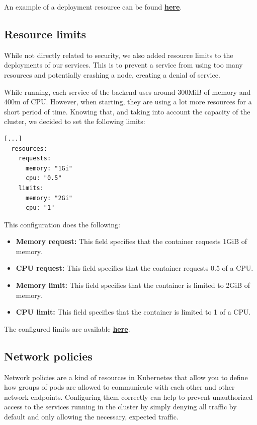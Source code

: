 \documentclass[12pt,x11names]{article}
\begin{document}
\medskip
An example of a deployment resource can be found \href{https://github.com/thomas-mauran/LinkedOut/blob/main/kube/base/api_gateway/deployment.yml}{\textbf{here}}.

\subsection{Resource limits}

While not directly related to security, we also added resource limits to the deployments
of our services. This is to prevent a service from using too many resources and potentially
crashing a node, creating a denial of service.

\medskip
While running, each service of the backend uses around 300MiB of memory and 400m of CPU. However,
when starting, they are using a lot more resources for a short period of time. Knowing that,
and taking into account the capacity of the cluster, we decided to set the following limits:

\begin{lstlisting}
[...]
  resources:
    requests:
      memory: "1Gi"
      cpu: "0.5"
    limits:
      memory: "2Gi"
      cpu: "1"
\end{lstlisting}

This configuration does the following:

\begin{itemize}
  \item \textbf{Memory request:} This field specifies that the container requests 1GiB of
  memory.
  \item \textbf{CPU request:} This field specifies that the container requests 0.5 of a CPU.
  \item \textbf{Memory limit:} This field specifies that the container is limited to 2GiB of
  memory.
  \item \textbf{CPU limit:} This field specifies that the container is limited to 1 of a CPU.
\end{itemize}

The configured limits are available \href{https://github.com/thomas-mauran/LinkedOut/blob/main/kube/prod/add-resource-limits.patch.yml}{\textbf{here}}.

\subsection{Network policies}

Network policies are a kind of resources in Kubernetes that allow you to define how groups
of pods are allowed to communicate with each other and other network endpoints. Configuring
them correctly can help to prevent unauthorized access to the services running in the cluster
by simply denying all traffic by default and only allowing the necessary, expected traffic.
\end{document}
